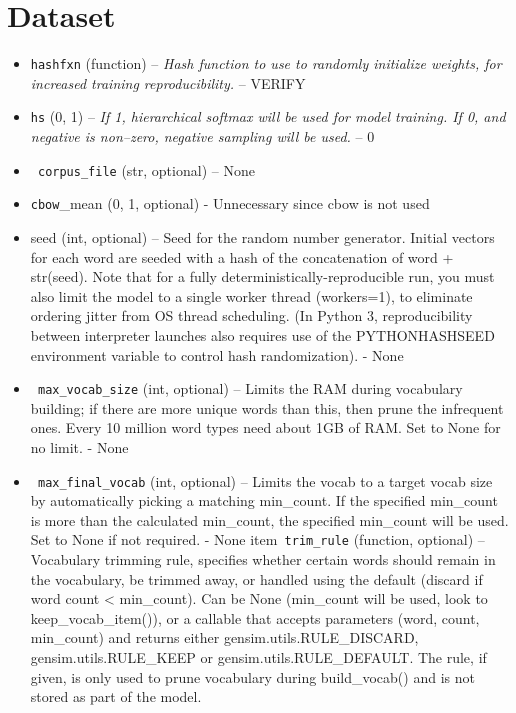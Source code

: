\chapter{Dataset}
\begin{itemize}
   \item \texttt{hashfxn} (function) -- \textit{Hash function to use to randomly initialize weights, for increased training reproducibility. }-- VERIFY 
  \item  \texttt{hs} ({0, 1}) --\textit{ If 1, hierarchical softmax will be used for model training. If 0, and negative is non--zero, negative sampling will be used. }-- 0
 \item  \texttt{ corpus\_file} (str, optional) – None
   \item \texttt{cbow}\_mean ({0, 1}, optional) - Unnecessary since cbow is not used
    \item seed (int, optional) – Seed for the random number generator. Initial vectors for each word are seeded with a hash of the concatenation of word + str(seed). Note that for a fully deterministically-reproducible run, you must also limit the model to a single worker thread (workers=1), to eliminate ordering jitter from OS thread scheduling. (In Python 3, reproducibility between interpreter launches also requires use of the PYTHONHASHSEED environment variable to control hash randomization). - None 
\item   \texttt{ max\_vocab\_size} (int, optional) – Limits the RAM during vocabulary building; if there are more unique words than this, then prune the infrequent ones. Every 10 million word types need about 1GB of RAM. Set to None for no limit. - None 
\item \texttt{   max\_final\_vocab} (int, optional) – Limits the vocab to a target vocab size by automatically picking a matching min\_count. If the specified min\_count is more than the calculated min\_count, the specified min\_count will be used. Set to None if not required. - None
item\texttt{   trim\_rule} (function, optional) –Vocabulary trimming rule, specifies whether certain words should remain in the vocabulary, be trimmed away, or handled using the default (discard if word count < min\_count). Can be None (min\_count will be used, look to keep\_vocab\_item()), or a callable that accepts parameters (word, count, min\_count) and returns either gensim.utils.RULE\_DISCARD, gensim.utils.RULE\_KEEP or gensim.utils.RULE\_DEFAULT. The rule, if given, is only used to prune vocabulary during build\_vocab() and is not stored as part of the model.


\end{itemize}

